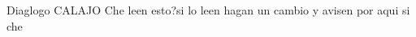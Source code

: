 \documentclass{article}
\begin{document}
Diaglogo CALAJO
Che leen esto?si lo leen hagan un cambio y avisen por aqui
si che 
\end{document}
